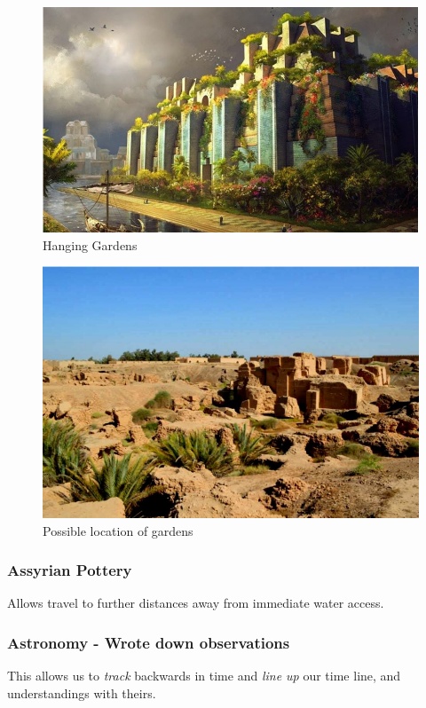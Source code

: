 \documentclass[11pt]{article}
\begin{document}
\begin{figure}[htb]
\centering
\includegraphics[width=.9\linewidth]{./img/HangingGardens.png}
\caption{Hanging Gardens}
\end{figure}

\begin{figure}[htb]
\centering
\includegraphics[width=.9\linewidth]{./img/HangingGardens2.png}
\caption{Possible location of gardens}
\end{figure}


\subsubsection{Assyrian Pottery}
\label{sec-3-8-3}
Allows travel to further distances away from immediate water access.

\subsubsection{Astronomy - Wrote down observations}
\label{sec-3-8-4}
This allows us to \emph{track} backwards in time and \emph{line up} our time line, and understandings with theirs.
\end{document}
